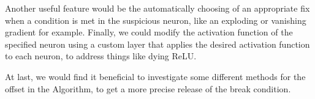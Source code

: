 Another useful feature would be the automatically choosing of an appropriate fix when a condition is met in the suspicious neuron, like an exploding or vanishing gradient for example.
Finally, we could modify the activation function of the specified neuron using a custom layer that applies the desired activation function to each neuron, to address things like dying ReLU.

At last, we would find it beneficial to investigate some different methods for the offset in the Algorithm, to get a more precise release of the break condition.
